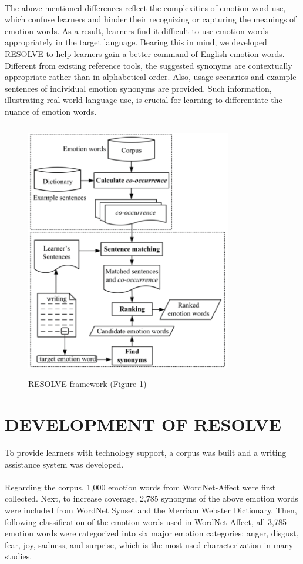 \documentclass[a4paper,12pt,oneside]{article}
\let\counterwithin\relax
\begin{document}
\paragraph{}
The above mentioned differences reflect the complexities of emotion word use, which confuse learners and hinder their recognizing or capturing the meanings of emotion words. As a result, learners find it difficult to use emotion words appropriately in the target language. Bearing this in mind, we developed RESOLVE to help learners gain a better command of English emotion words. Different from existing reference tools, the suggested synonyms are contextually appropriate rather than in alphabetical order. Also, usage scenarios and example sentences of individual emotion synonyms are provided. Such information, illustrating real-world language use, is crucial for learning to differentiate the nuance of emotion words. 


\begin{figure}[H]
\includegraphics[height=11.25cm,width=9cm]{Figure1.png}
\centering
\caption{RESOLVE framework (Figure 1)}
\end{figure}

\newpage
\section{DEVELOPMENT OF RESOLVE}
To provide learners with technology support, a corpus was built and a writing assistance system was developed. 
\paragraph{}
Regarding the corpus, 1,000 emotion words from WordNet-Affect were first collected. Next, to increase coverage, 2,785 synonyms of the above emotion words were included from WordNet Synset and the Merriam Webster Dictionary. Then, following classification of the emotion words used in WordNet Affect, all 3,785 emotion words were categorized into six major emotion categories: anger, disgust, fear, joy, sadness, and surprise, which is the most used characterization in many studies. 
\end{document}
